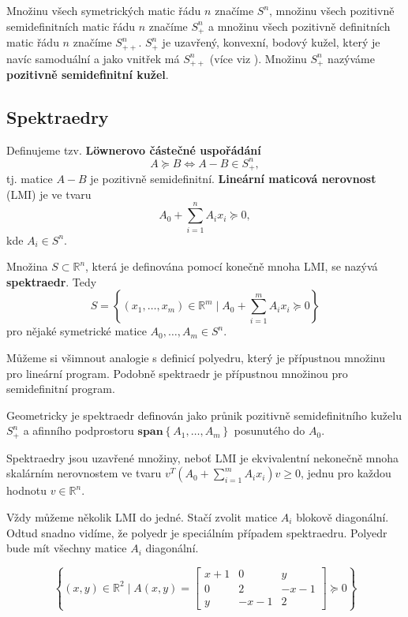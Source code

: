 Množinu všech symetrických matic řádu $n$ značíme $S^n$, množinu všech pozitivně semidefinitních matic řádu $n$ značíme $S_+^n$ a množinu všech pozitivně definitních matic řádu $n$ značíme $S_{++}^n$. $S_+^n$ je uzavřený, konvexní, bodový kužel, který je navíc samoduální a jako vnitřek má $S_{++}^n$ (více viz \cite{sdp-cone}). Množinu $S_+^n$ nazýváme \textbf{pozitivně semidefinitní kužel}.


\subsection*{Spektraedry}

Definujeme tzv. \textbf{L\"{o}wnerovo částečné uspořádání}
$$
    A \succeq B \iff A - B \in S_+^n,
$$
tj. matice $A - B$ je pozitivně semidefinitní. \textbf{Lineární maticová nerovnost} (LMI) je ve tvaru
$$
    A_0 + \sum_{i=1}^n A_i x_i \succeq 0,
$$
kde $A_i \in S^n$.

Množina $S \subset \mathbb{R}^n$, která je definována pomocí konečně mnoha LMI, se nazývá \textbf{spektraedr}. Tedy
$$
    S = \left\{ (x_1, \dots, x_m) \in \mathbb{R}^m \mid A_0 + \sum_{i=1}^m A_i x_i \succeq 0 \right\}
$$
pro nějaké symetrické matice $A_0, \dots, A_m \in S^n$.

Můžeme si všimnout analogie s definicí polyedru, který je přípustnou množinu pro lineární program. Podobně spektraedr je přípustnou množinou pro semidefinitní program.

Geometricky je spektraedr definován jako průnik pozitivně semidefinitního kuželu $S_+^n$ a afinního podprostoru $\textbf{span}\left\{ A_1, \dots, A_m \right\}$ posunutého do $A_0$.

Spektraedry jsou uzavřené množiny, neboť LMI je ekvivalentní nekonečně mnoha skalárním nerovnostem ve tvaru $v^T(A_0 + \sum_{i=1}^m A_ix_i)v \geq 0$, jednu pro každou hodnotu $v \in \mathbb{R}^n$.

Vždy můžeme několik LMI  do jedné. Stačí zvolit matice $A_i$ blokově diagonální. Odtud snadno vidíme, že polyedr je speciálním případem spektraedru. Polyedr bude mít všechny matice $A_i$ diagonální.

\begin{pr}
    $$
        \left\{ (x, y) \in \mathbb{R}^2 \mid A(x,y) =
        \begin{bmatrix}
            x + 1 & 0      & y \\
            0     & 2      & -x - 1 \\
            y     & -x - 1 & 2
        \end{bmatrix}
        \succeq 0 \right\}
    $$
\end{pr}

